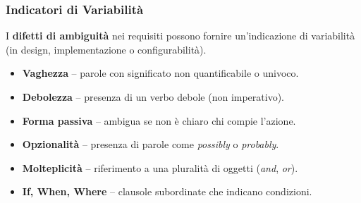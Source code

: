 \documentclass{beamer}
\begin{document}
\begin{frame}
\frametitle{Indicatori di Variabilità}

I \textbf{difetti di ambiguità} nei requisiti possono fornire un’indicazione di variabilità (in design, implementazione o configurabilità).

\vspace{0.25cm}
\begin{itemize}
\item \textbf{Vaghezza} -- parole con significato non quantificabile o univoco.
\item \textbf{Debolezza} -- presenza di un verbo debole (non imperativo).
\item \textbf{Forma passiva} -- ambigua se non è chiaro chi compie l'azione.
\item \textbf{Opzionalità} -- presenza di parole come \textit{possibly} o \textit{probably}.
\item \textbf{Molteplicità} -- riferimento a una pluralità di oggetti (\textit{and}, \textit{or}).
\item \textbf{If, When, Where} -- clausole subordinate che indicano condizioni.
\end{itemize}
\end{frame}
\end{document}
